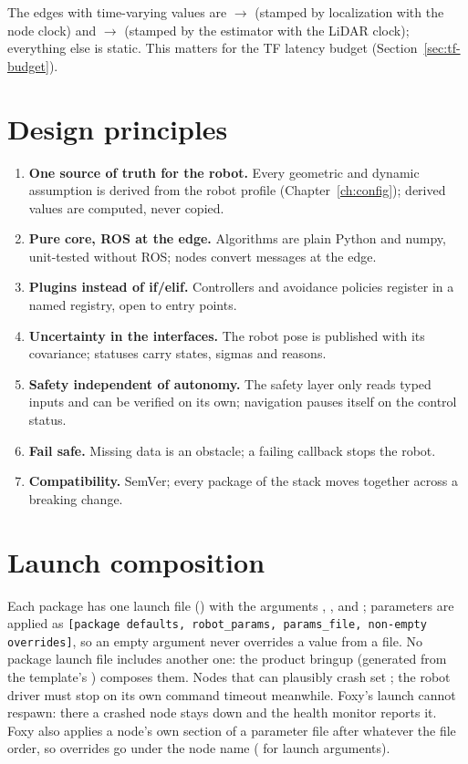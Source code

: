 The edges with time-varying values are $\to$ (stamped by localization with
the node clock) and $\to$ (stamped by the estimator with the LiDAR
clock); everything else is static. This matters for the TF latency budget
(Section~\ref{sec:tf-budget}).

\section{Design principles}

\begin{enumerate}
  \item \textbf{One source of truth for the robot.} Every geometric and dynamic assumption is
    derived from the robot profile (Chapter~\ref{ch:config}); derived values are computed,
    never copied.
  \item \textbf{Pure core, ROS at the edge.} Algorithms are plain Python and numpy, unit-tested
    without ROS; nodes convert messages at the edge.
  \item \textbf{Plugins instead of if/elif.} Controllers and avoidance policies register in a
    named registry, open to entry points.
  \item \textbf{Uncertainty in the interfaces.} The robot pose is published with its
    covariance; statuses carry states, sigmas and reasons.
  \item \textbf{Safety independent of autonomy.} The safety layer only reads typed inputs and
    can be verified on its own; navigation pauses itself on the control status.
  \item \textbf{Fail safe.} Missing data is an obstacle; a failing callback stops the robot.
  \item \textbf{Compatibility.} SemVer; every package of the stack moves together across a
    breaking change.
\end{enumerate}

\section{Launch composition}

Each package has one launch file () with the arguments
, ,  and ; parameters
are applied as \texttt{[package defaults, robot\_params, params\_file, non-empty overrides]}, so an
empty argument never overrides a value from a file. No package launch file includes another
one: the product bringup (generated from the template's ) composes them.
Nodes that can plausibly crash set ; the robot driver must stop on its own
command timeout meanwhile. Foxy's launch cannot respawn: there a crashed node stays down and the
health monitor reports it. Foxy also applies a node's own section of a parameter file after
\code{/**} whatever the file order, so overrides go under the node name
( for launch arguments).
